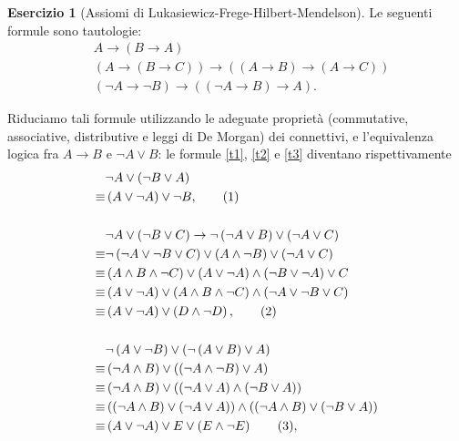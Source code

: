 \documentclass[a4paper]{article}
\newcommand{\limplies}{\rightarrow}
\newcommand\numberthis{\addtocounter{equation}{1}\tag{\theequation}}
\theoremstyle{definition}
\theoremstyle{definition}
\theoremstyle{remark}
\theoremstyle{definition}
\newtheorem{exercise}{Esercizio}[section]
\begin{document}
\begin{exercise}[Assiomi di Lukasiewicz-Frege-Hilbert-Mendelson]
	Le seguenti formule sono tautologie:
	\begin{align}
	&A \limplies \left( B\limplies A \right) \label{t1} \\
	&\left( A \limplies \left( B \limplies C \right)  \right) \limplies \left( \left( A\limplies B \right) \limplies \left( A \limplies C \right)  \right) \label{t2} \\
	&\left( \lnot A\limplies\lnot B \right) \limplies \left( \left( \lnot A \limplies B \right) \limplies A \right) \label{t3}
.\end{align}
\end{exercise}
Riduciamo tali formule utilizzando le adeguate proprietà (commutative, associative, distributive e leggi di De Morgan) dei connettivi, e l'equivalenza logica fra $A \limplies B$ e $\lnot A \lor B$: le formule \eqref{t1}, \eqref{t2} e \eqref{t3} diventano rispettivamente
\setcounter{equation}{0}
\begin{align*}
	&\lnot A \lor \left( \lnot B \lor A \right) \\\equiv& \left( A\lor\lnot A  \right) \lor \lnot B, \numberthis\\\\
	&\lnot A \lor \left( \lnot B \lor C \right) \limplies \lnot \left( \lnot A \lor B \right)  \lor \left( \lnot A \lor C \right)  \\\equiv& \lnot \left( \lnot A\lor\lnot B\lor C
\right) \lor \left( A\land \lnot B \right) \lor \left( \lnot A \lor C\right) \\\equiv& \left( A\land B\land \lnot C \right)\lor \left( A\lor \lnot A \right) \land \left( \lnot
B \lor \lnot A\right) \lor C \\\equiv& \left( A\lor \lnot A \right)\lor \left( A\land B\land \lnot C \right) \land \left(  \lnot A \lor\lnot
B \lor C\right)\\\equiv&\left( A\lor\lnot A \right) \lor \left( D\land \lnot D \right),\numberthis\\\\
		       &\lnot\left( A\lor\lnot B \right) \lor \left( \lnot\left( A\lor B \right) \lor A \right) \\\equiv& \left( \lnot A\land B \right) \lor\left( \left( \lnot A \land\lnot B \right) \lor A
\right) \\\equiv&
\left( \lnot A\land B \right) \lor \left( \left( \lnot A\lor A \right) \land\left( \lnot B\lor A \right)  \right) \\\equiv& \left( (\lnot A \land B)\lor(\lnot A\lor A) \right) \land
\left( \left( \lnot A\land B \right) \lor \left( \lnot B\lor A \right)  \right) \\\equiv
															  &\left( A\lor\lnot A \right) \lor E\lor\left( E\land\lnot
															  E \right)\numberthis,
\end{align*}
\end{document}
